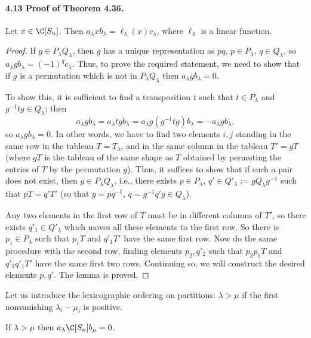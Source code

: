 \paragraph{4.13 Proof of Theorem 4.36.}
\begin{lemma}[4.40]
Let $x\in\C[S_n]$. Then $a_\lambda xb_\lambda=\ell_\lambda(x)c_\lambda$, where $\ell_\lambda$ is a linear function.
\end{lemma}
\begin{proof}
If $g\in P_\lambda Q_\lambda$, then $g$ has a unique representation as $pq$, $p\in P_\lambda$, $q\in Q_\lambda$, so $a_\lambda gb_\lambda=(-1)^q c_\lambda$. Thus, to prove the required statement, we need to show that if $g$ is a permutation which is not in $P_\lambda Q_\lambda$ then $a_\lambda gb_\lambda=0$.

To show this, it is sufficient to find a transposition $t$ such that $t\in P_\lambda$ and $g^{-1}tg\in Q_\lambda$; then
\[
a_\lambda gb_\lambda=a_\lambda tgb_\lambda
=a_\lambda g(g^{-1}tg)b_\lambda=-a_\lambda gb_\lambda,
\]
so $a_\lambda gb_\lambda=0$. In other words, we have to find two elements $i,j$ standing in the same row in the tableau $T=T_\lambda$, and in the same column in the tableau $T'=gT$ (where $gT$ is the tableau of the same shape as $T$ obtained by permuting the entries of $T$ by the permutation $g$). Thus, it suffices to show that if such a pair does not exist, then $g\in P_\lambda Q_\lambda$, i.e., there exists $p\in P_\lambda$, $q'\in Q'_\lambda:=gQ_\lambda g^{-1}$ such that $pT=q'T'$ (so that $g=pq^{-1}$, $q=g^{-1}q'g\in Q_\lambda$).

Any two elements in the first row of $T$ must be in different columns of $T'$, so there exists $q'_1\in Q'_\lambda$ which moves all these elements to the first row. So there is $p_1\in P_\lambda$ such that $p_1T$ and $q'_1T'$ have the same first row. Now do the same procedure with the second row, finding elements $p_2,q'_2$ such that $p_2p_1T$ and $q'_2q'_1T'$ have the same first two rows. Continuing so, we will construct the desired elements $p,q'$. The lemma is proved.
\end{proof}
Let us introduce the lexicographic ordering on partitions: $\lambda>\mu$ if the first nonvanishing $\lambda_i-\mu_i$ is positive.
\begin{lemma}[4.41]
If $\lambda>\mu$ then $a_\lambda\C[S_n]b_\mu=0$.
\end{lemma}
